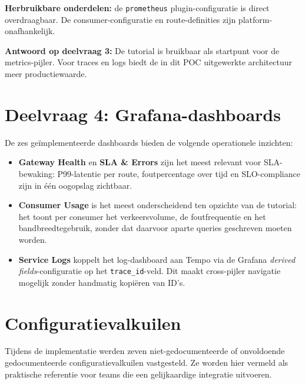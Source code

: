 \textbf{Herbruikbare onderdelen:} de \texttt{prometheus} plugin-configuratie is direct overdraagbaar. De consumer-configuratie en route-definities zijn platform-onafhankelijk.

\textbf{Antwoord op deelvraag 3:} De tutorial is bruikbaar als startpunt voor de metrics-pijler. Voor traces en logs biedt de in dit POC uitgewerkte architectuur meer productiewaarde.

\section{Deelvraag 4: Grafana-dashboards}%
\label{sec:bevinding-dashboards}

De zes geïmplementeerde dashboards bieden de volgende operationele inzichten:

\begin{itemize}
  \item \textbf{Gateway Health} en \textbf{SLA \& Errors} zijn het meest relevant voor SLA-bewaking: P99-latentie per route, foutpercentage over tijd en SLO-compliance zijn in één oogopslag zichtbaar.
  \item \textbf{Consumer Usage} is het meest onderscheidend ten opzichte van de tutorial: het toont per consumer het verkeersvolume, de foutfrequentie en het bandbreedtegebruik, zonder dat daarvoor aparte queries geschreven moeten worden.
  \item \textbf{Service Logs} koppelt het log-dashboard aan Tempo via de Grafana \textit{derived fields}-configuratie op het \texttt{trace\_id}-veld. Dit maakt cross-pijler navigatie mogelijk zonder handmatig kopiëren van ID's.
\end{itemize}

\section{Configuratievalkuilen}%
\label{sec:bevinding-gotchas}

Tijdens de implementatie werden zeven niet-gedocumenteerde of onvoldoende gedocumenteerde configuratievalkuilen vastgesteld. Ze worden hier vermeld als praktische referentie voor teams die een gelijkaardige integratie uitvoeren.

